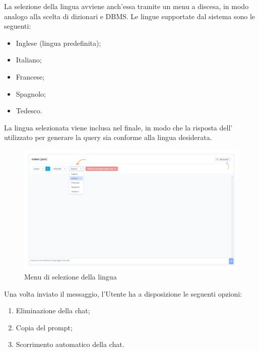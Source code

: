  \label{sec:lingua-chat}

\par La selezione della lingua avviene anch'essa tramite un menu a discesa, in modo analogo alla scelta di dizionari e DBMS. Le lingue supportate dal sistema sono le seguenti:
\begin{itemize}
  \item Inglese (lingua predefinita);
  \item Italiano;
  \item Francese;
  \item Spagnolo;
  \item Tedesco.
\end{itemize}

\vspace{0.5\baselineskip}
\par La lingua selezionata viene inclusa nel  finale, in modo che la risposta dell' utilizzato per generare la query  sia conforme alla lingua desiderata.

\begin{figure}[H]
  \centering
  \includegraphics[width=1\textwidth]{assets/cambio_lingua.png}
  \caption{Menu di selezione della lingua}
\end{figure}

\par Una volta inviato il messaggio, l'Utente ha a disposizione le seguenti opzioni:
\begin{enumerate}
  \item Eliminazione della chat;
  \item Copia del prompt;
  \item Scorrimento automatico della chat.
\end{enumerate}

